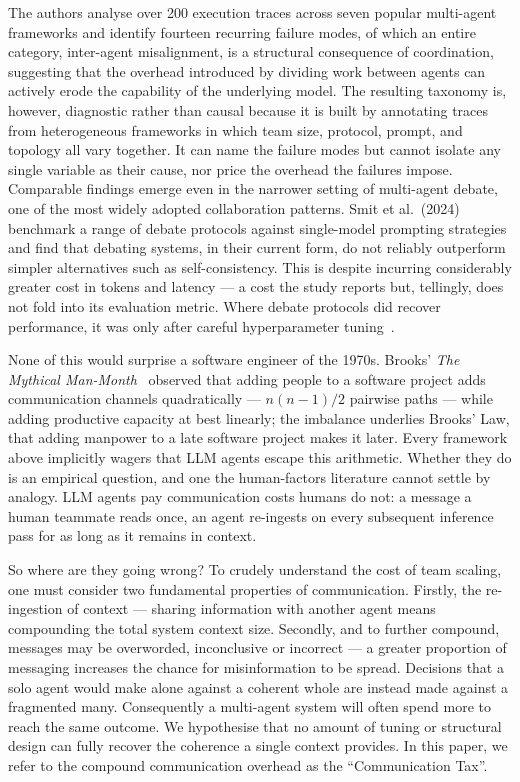 \documentclass[11pt,a4paper]{article}
\begin{document}
The authors analyse over 200 execution traces across seven popular multi-agent frameworks and identify fourteen recurring failure modes, of which an entire category, inter-agent misalignment, is a structural consequence of coordination, suggesting that the overhead introduced by dividing work between agents can actively erode the capability of the underlying model. The resulting taxonomy is, however, diagnostic rather than causal because it is built by annotating traces from heterogeneous frameworks in which team size, protocol, prompt, and topology all vary together. It can name the failure modes but cannot isolate any single variable as their cause, nor price the overhead the failures impose. Comparable findings emerge even in the narrower setting of multi-agent debate, one of the most widely adopted collaboration patterns. Smit et al.\ (2024) benchmark a range of debate protocols against single-model prompting strategies and find that debating systems, in their current form, do not reliably outperform simpler alternatives such as self-consistency. This is despite incurring considerably greater cost in tokens and latency --- a cost the study reports but, tellingly, does not fold into its evaluation metric. Where debate protocols did recover performance, it was only after careful hyperparameter tuning~\cite{smit2024mad}.

None of this would surprise a software engineer of the 1970s. Brooks' \emph{The Mythical Man-Month}~\cite{brooks1975mythical} observed that adding people to a software project adds communication channels quadratically --- $n(n-1)/2$ pairwise paths --- while adding productive capacity at best linearly; the imbalance underlies Brooks' Law, that adding manpower to a late software project makes it later. Every framework above implicitly wagers that LLM agents escape this arithmetic. Whether they do is an empirical question, and one the human-factors literature cannot settle by analogy. LLM agents pay communication costs humans do not: a message a human teammate reads once, an agent re-ingests on every subsequent inference pass for as long as it remains in context.

So where are they going wrong? To crudely understand the cost of team scaling, one must consider two fundamental properties of communication. Firstly, the re-ingestion of context --- sharing information with another agent means compounding the total system context size. Secondly, and to further compound, messages may be overworded, inconclusive or incorrect --- a greater proportion of messaging increases the chance for misinformation to be spread. Decisions that a solo agent would make alone against a coherent whole are instead made against a fragmented many. Consequently a multi-agent system will often spend more to reach the same outcome. We hypothesise that no amount of tuning or structural design can fully recover the coherence a single context provides. In this paper, we refer to the compound communication overhead as the ``Communication Tax''.
\end{document}
